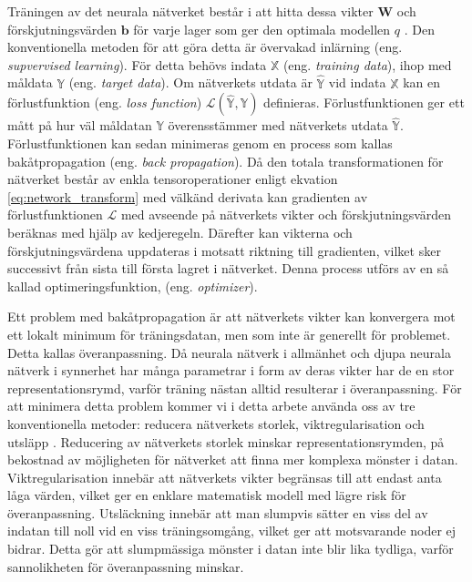 Träningen av det neurala nätverket består i att hitta dessa vikter $\textbf{W}$ och förskjutningsvärden $\textbf{b}$ för varje lager som ger den optimala modellen $q$ \cite{Chollet}. Den konventionella metoden för att göra detta är övervakad inlärning (eng. \emph{supvervised learning}). För detta behövs indata $\mathbb{X}$ (eng. \emph{training data}), ihop med måldata $\mathbb{Y}$ (eng. \emph{target data}). Om nätverkets utdata är $\mathbb{\hat{Y}}$ vid indata $\mathbb{X}$ kan en förlustfunktion (eng. \emph{loss function}) $\mathcal{L}\left(\mathbb{\hat{Y}}, \mathbb{Y} \right)$ definieras. Förlustfunktionen ger ett mått på hur väl måldatan $\mathbb{Y}$ överensstämmer med nätverkets utdata $\mathbb{\hat{Y}}$. Förlustfunktionen kan sedan minimeras genom en process som kallas bakåtpropagation (eng. \emph{back propagation}). Då den totala transformationen för nätverket består av enkla tensoroperationer enligt ekvation \eqref{eq:network_transform} med välkänd derivata kan gradienten av förlustfunktionen $\mathcal{L}$ med avseende på nätverkets vikter och förskjutningsvärden beräknas med hjälp av kedjeregeln. Därefter kan vikterna och förskjutningsvärdena uppdateras i motsatt riktning till gradienten, vilket sker successivt från sista till första lagret i nätverket. Denna process utförs av en så kallad optimeringsfunktion, (eng. \emph{optimizer}).

%         

Ett problem med bakåtpropagation är att nätverkets vikter kan konvergera mot ett lokalt minimum för träningsdatan, men som inte är generellt för problemet. Detta kallas överanpassning. Då neurala nätverk i allmänhet och djupa neurala nätverk i synnerhet har många parametrar i form av deras vikter har de en stor representationsrymd, varför träning nästan alltid resulterar i överanpassning. För att minimera detta problem kommer vi i detta arbete använda oss av tre konventionella metoder: reducera nätverkets storlek, viktregularisation och utsläpp \cite{Chollet}. Reducering av nätverkets storlek minskar representationsrymden, på bekostnad av möjligheten för nätverket att finna mer komplexa mönster i datan. Viktregularisation innebär att nätverkets vikter begränsas till att endast anta låga värden, vilket ger en enklare matematisk modell med lägre risk för överanpassning. Utsläckning innebär att man slumpvis sätter en viss del av indatan till noll vid en viss träningsomgång, vilket ger att motsvarande noder ej bidrar. Detta gör att slumpmässiga mönster i datan inte blir lika tydliga, varför sannolikheten för överanpassning minskar.

